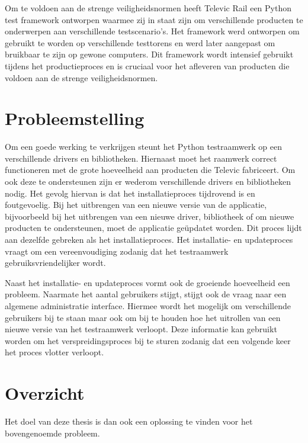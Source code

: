 Om te voldoen aan de strenge veiligheidsnormen heeft Televic Rail een Python test framework ontworpen waarmee zij in staat zijn om verschillende producten te onderwerpen aan verschillende testscenario's.
Het framework werd ontworpen om gebruikt te worden op verschillende testtorens en werd later aangepast om bruikbaar te zijn op gewone computers.
Dit framework wordt intensief gebruikt tijdens het productieproces en is cruciaal voor het afleveren van producten die voldoen aan de strenge veiligheidsnormen.


\section{Probleemstelling}\label{sec:probleem}
Om een goede werking te verkrijgen steunt het Python testraamwerk op een verschillende drivers en bibliotheken.
Hiernaast moet het raamwerk correct functioneren met de grote hoeveelheid aan producten die Televic fabriceert.
Om ook deze te ondersteunen zijn er wederom verschillende drivers en bibliotheken nodig.
Het gevolg hiervan is dat het installatieproces tijdrovend is en foutgevoelig.
Bij het uitbrengen van een nieuwe versie van de applicatie, bijvoorbeeld bij het uitbrengen van een nieuwe driver, bibliotheek of om nieuwe producten te ondersteunen, moet de applicatie geüpdatet worden.
Dit proces lijdt aan dezelfde gebreken als het installatieproces.
Het installatie- en updateproces vraagt om een vereenvoudiging zodanig dat het testraamwerk gebruiksvriendelijker wordt.

Naast het installatie- en updateproces vormt ook de groeiende hoeveelheid een probleem.
Naarmate het aantal gebruikers stijgt, stijgt ook de vraag naar een algemene administratie interface.
Hiermee wordt het mogelijk om verschillende gebruikers bij te staan maar ook om bij te houden hoe het uitrollen van een nieuwe versie van het testraamwerk verloopt.
Deze informatie kan gebruikt worden om het verspreidingsproces bij te sturen zodanig dat een volgende keer het proces vlotter verloopt.

\section{Overzicht}
Het doel van deze thesis is dan ook een oplossing te vinden voor het bovengenoemde probleem.